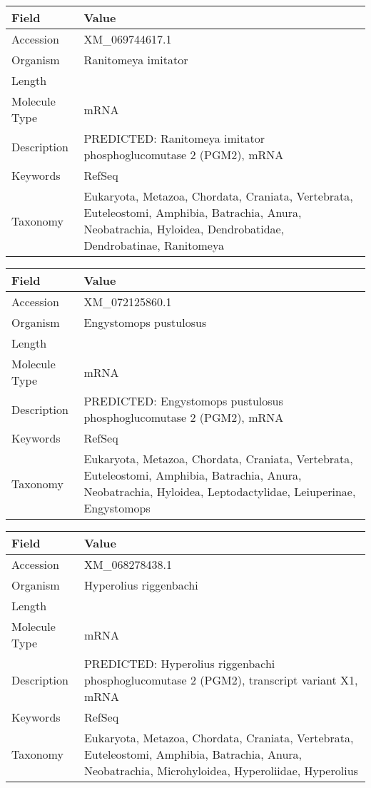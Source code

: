 \documentclass[10pt]{article}
\begin{document}
\vspace{1em}
{\footnotesize
\begin{longtable}{>{\raggedright\arraybackslash}p{4.5cm} >{\raggedright\arraybackslash}p{11.5cm}}
\textbf{Field} & \textbf{Value} \\
\hline
Accession & XM\_069744617.1 \\
Organism & Ranitomeya imitator \\
Length & 2750 \\
Molecule Type & mRNA \\
Description & PREDICTED: Ranitomeya imitator phosphoglucomutase 2 (PGM2), mRNA \\
Keywords & RefSeq \\
Taxonomy & Eukaryota, Metazoa, Chordata, Craniata, Vertebrata, Euteleostomi, Amphibia, Batrachia, Anura, Neobatrachia, Hyloidea, Dendrobatidae, Dendrobatinae, Ranitomeya \\
\end{longtable}
}

\vspace{1em}
{\footnotesize
\begin{longtable}{>{\raggedright\arraybackslash}p{4.5cm} >{\raggedright\arraybackslash}p{11.5cm}}
\textbf{Field} & \textbf{Value} \\
\hline
Accession & XM\_072125860.1 \\
Organism & Engystomops pustulosus \\
Length & 2267 \\
Molecule Type & mRNA \\
Description & PREDICTED: Engystomops pustulosus phosphoglucomutase 2 (PGM2), mRNA \\
Keywords & RefSeq \\
Taxonomy & Eukaryota, Metazoa, Chordata, Craniata, Vertebrata, Euteleostomi, Amphibia, Batrachia, Anura, Neobatrachia, Hyloidea, Leptodactylidae, Leiuperinae, Engystomops \\
\end{longtable}
}

\vspace{1em}
{\footnotesize
\begin{longtable}{>{\raggedright\arraybackslash}p{4.5cm} >{\raggedright\arraybackslash}p{11.5cm}}
\textbf{Field} & \textbf{Value} \\
\hline
Accession & XM\_068278438.1 \\
Organism & Hyperolius riggenbachi \\
Length & 3838 \\
Molecule Type & mRNA \\
Description & PREDICTED: Hyperolius riggenbachi phosphoglucomutase 2 (PGM2), transcript variant X1, mRNA \\
Keywords & RefSeq \\
Taxonomy & Eukaryota, Metazoa, Chordata, Craniata, Vertebrata, Euteleostomi, Amphibia, Batrachia, Anura, Neobatrachia, Microhyloidea, Hyperoliidae, Hyperolius \\
\end{longtable}
}
\end{document}
